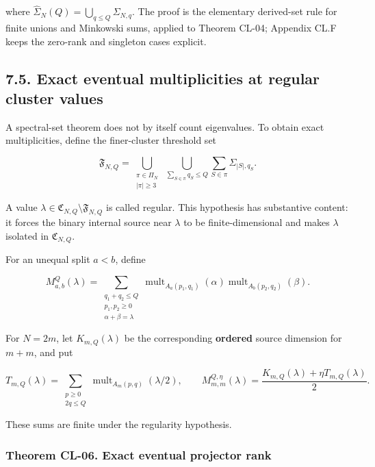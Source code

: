 where \(\widehat\Sigma_N(Q)=\bigcup_{q\leq Q}\Sigma_{N,q}\). The proof is the elementary derived-set rule for finite unions and Minkowski sums, applied to Theorem CL-04; Appendix CL.F keeps the zero-rank and singleton cases explicit.

\hypertarget{exact-eventual-multiplicities-at-regular-cluster-values}{%
\subsection{7.5. Exact eventual multiplicities at regular cluster values}\label{exact-eventual-multiplicities-at-regular-cluster-values}}

A spectral-set theorem does not by itself count eigenvalues. To obtain exact multiplicities, define the finer-cluster threshold set

\[
\mathfrak F_{N,Q}=\bigcup_{\substack{\pi\in\Pi_N\\|\pi|\geq3}}
\ \bigcup_{\sum_{S\in\pi}q_S\leq Q}
\sum_{S\in\pi}\Sigma_{|S|,q_S}.
\tag{CL.16}
\]

A value \(\lambda\in\mathfrak C_{N,Q}\setminus\mathfrak F_{N,Q}\) is called regular. This hypothesis has substantive content: it forces the binary internal source near \(\lambda\) to be finite-dimensional and makes \(\lambda\) isolated in \(\mathfrak C_{N,Q}\).

For an unequal split \(a<b\), define

\[
M_{a,b}^{Q}(\lambda)=
\sum_{\substack{q_1+q_2\leq Q\\p_1,p_2\geq0\\\alpha+\beta=\lambda}}
\operatorname{mult}_{A_a(p_1,q_1)}(\alpha)
\operatorname{mult}_{A_b(p_2,q_2)}(\beta).
\tag{CL.17}
\]

For \(N=2m\), let \(K_{m,Q}(\lambda)\) be the corresponding \textbf{ordered} source dimension for \(m+m\), and put

\[
T_{m,Q}(\lambda)=
\sum_{\substack{p\geq0\\2q\leq Q}}
\operatorname{mult}_{A_m(p,q)}(\lambda/2),
\qquad
M_{m,m}^{Q,\eta}(\lambda)
=\frac{K_{m,Q}(\lambda)+\eta T_{m,Q}(\lambda)}2.
\tag{CL.18}
\]

These sums are finite under the regularity hypothesis.

\hypertarget{theorem-cl-06.-exact-eventual-projector-rank}{%
\subsubsection{Theorem CL-06. Exact eventual projector rank}\label{theorem-cl-06.-exact-eventual-projector-rank}}

